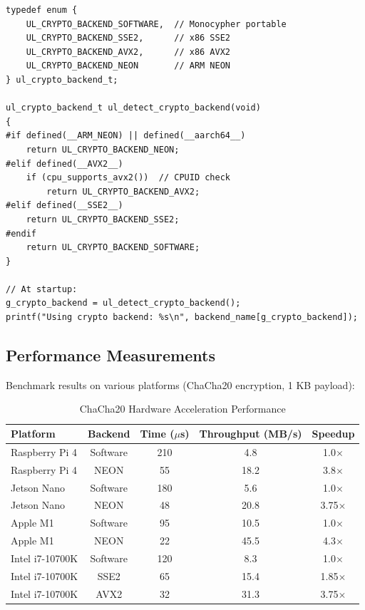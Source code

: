 \documentclass[11pt,a4paper]{article}
\begin{document}
\begin{lstlisting}[caption={Runtime SIMD Backend Selection}]
typedef enum {
    UL_CRYPTO_BACKEND_SOFTWARE,  // Monocypher portable
    UL_CRYPTO_BACKEND_SSE2,      // x86 SSE2
    UL_CRYPTO_BACKEND_AVX2,      // x86 AVX2
    UL_CRYPTO_BACKEND_NEON       // ARM NEON
} ul_crypto_backend_t;

ul_crypto_backend_t ul_detect_crypto_backend(void)
{
#if defined(__ARM_NEON) || defined(__aarch64__)
    return UL_CRYPTO_BACKEND_NEON;
#elif defined(__AVX2__)
    if (cpu_supports_avx2())  // CPUID check
        return UL_CRYPTO_BACKEND_AVX2;
#elif defined(__SSE2__)
    return UL_CRYPTO_BACKEND_SSE2;
#endif
    return UL_CRYPTO_BACKEND_SOFTWARE;
}

// At startup:
g_crypto_backend = ul_detect_crypto_backend();
printf("Using crypto backend: %s\n", backend_name[g_crypto_backend]);
\end{lstlisting}

\subsection{Performance Measurements}

Benchmark results on various platforms (ChaCha20 encryption, 1 KB payload):

\begin{table}[H]
\centering
\begin{tabular}{@{}lcccc@{}}
\toprule
\textbf{Platform} & \textbf{Backend} & \textbf{Time ($\mu$s)} & \textbf{Throughput (MB/s)} & \textbf{Speedup} \\
\midrule
Raspberry Pi 4     & Software & 210 & 4.8  & 1.0$\times$ \\
Raspberry Pi 4     & NEON     & 55  & 18.2 & 3.8$\times$ \\
\midrule
Jetson Nano        & Software & 180 & 5.6  & 1.0$\times$ \\
Jetson Nano        & NEON     & 48  & 20.8 & 3.75$\times$ \\
\midrule
Apple M1           & Software & 95  & 10.5 & 1.0$\times$ \\
Apple M1           & NEON     & 22  & 45.5 & 4.3$\times$ \\
\midrule
Intel i7-10700K    & Software & 120 & 8.3  & 1.0$\times$ \\
Intel i7-10700K    & SSE2     & 65  & 15.4 & 1.85$\times$ \\
Intel i7-10700K    & AVX2     & 32  & 31.3 & 3.75$\times$ \\
\bottomrule
\end{tabular}
\caption{ChaCha20 Hardware Acceleration Performance}
\end{table}
\end{document}
